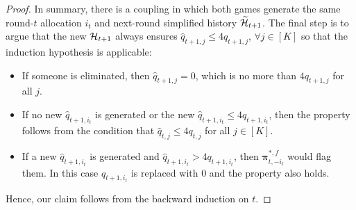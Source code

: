 \begin{proof}
In summary, there is a coupling in which both games generate the same round-$t$ allocation $i_t$ and next-round simplified history $\widetilde {\mathcal{H}}_{t+1}$.
The final step is to argue that the new $\mathcal{H}_{t+1}$ always ensures $\hat q_{t+1,j}\le 4q_{t+1,j}$, $\forall j\in [K]$ so that the induction hypothesis is applicable:
\begin{itemize}
\item If someone is eliminated, then $\hat q_{t+1,j}=0$, which is no more than $4q_{t+1,j}$ for all $j$.
\item If no new $\hat q_{t+1,i_t}$ is generated or the new $\hat q_{t+1,i_t}\le 4q_{t+1,i_t}$, then the property follows from the condition that $\hat q_{t,j}\le 4q_{t,j}$ for all $j\in [K]$.
\item If a new $\hat q_{t+1,i_t}$ is generated and $\hat q_{t+1,i_t}>4q_{t+1,i_t}$, then ${\bm \pi}_{t,-i_t}^{\ast,f}$ would flag them. In this case $\hat q_{t+1,i_t}$ is replaced with 0 and the property also holds.
\end{itemize}
Hence, our claim follows from the backward induction on $t$.
\end{proof}

